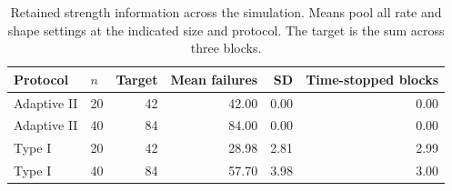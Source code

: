 \begin{table}[htbp]
\centering
\caption{Retained strength information across the simulation. Means pool all rate and shape settings at the indicated size and protocol. The target is the sum across three blocks.}\label{tab:failures}
\small
\begin{tabular}{llrrrr}
\toprule
Protocol & $n$ & Target & Mean failures & SD & Time-stopped blocks \\
\midrule
Adaptive II & 20 & 42 & 42.00 & 0.00 & 0.00 \\
Adaptive II & 40 & 84 & 84.00 & 0.00 & 0.00 \\
Type I & 20 & 42 & 28.98 & 2.81 & 2.99 \\
Type I & 40 & 84 & 57.70 & 3.98 & 3.00 \\
\bottomrule
\end{tabular}
\end{table}
